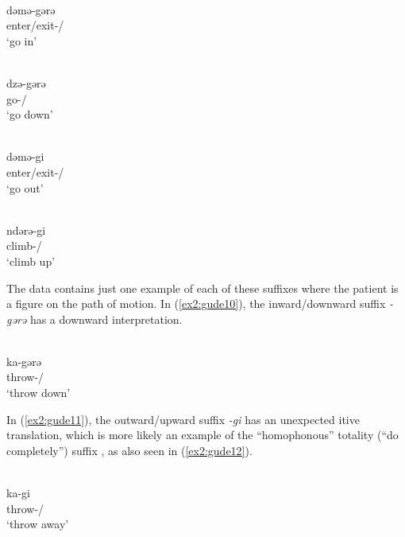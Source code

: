 \ea\label{ex2:gude6}
 \\
\gll dəmə-gərə	\\
enter/exit-/ \\
\glt `go in'

\ex\label{ex2:gude7}
 \\
\gll dzə-gərə	\\
go-/	\\
\glt `go down'

\ex\label{ex2:gude8}
 \\
\gll dəmə-gi \\
enter/exit-/	\\
\glt `go out'

\ex\label{ex2:gude9}
 \\
\gll ndərə-gi	\\
climb-/ \\
\glt `climb up'
\z 

The data contains just one example of each of these suffixes where the patient is a figure on the path of motion. In (\ref{ex2:gude10}), the inward/downward suffix \textit{-gərə} has a downward interpretation. 

\ea\label{ex2:gude10}
 \\
\gll ka-gərə	\\
throw-/	\\	
\glt `throw down'
\z 

In (\ref{ex2:gude11}), the outward/upward suffix \textit{-gi} has an unexpected itive translation, which is more likely an example of the ``homophonous'' totality (``do completely'') suffix \citep[101]{hoskinsonGrammarDictionaryGude1983}, as also seen in (\ref{ex2:gude12}). 

\ea\label{ex2:gude11}
 \\
\gll ka-gi \\
throw-/	\\
\glt `throw away'

